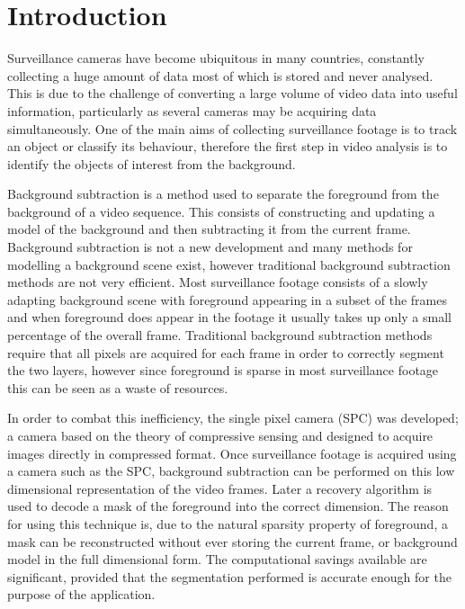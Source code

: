 \section{Introduction}
Surveillance cameras have become ubiquitous in many countries, constantly collecting a huge amount of data most of which is stored and never analysed. This is due to the challenge of converting a large volume of video data into useful information, particularly as several cameras may be acquiring data simultaneously. One of the main aims of collecting surveillance footage is to track an object or classify its behaviour, therefore the first step in video analysis is to identify the objects of interest from the background.


Background subtraction \cite{Piccardi2004a} is a method used to separate the foreground from the background of a video sequence. This consists of constructing and updating a model of the background and then subtracting it from the current frame. Background subtraction is not a new development and many methods for modelling a background scene exist, however traditional background subtraction methods are not very efficient. Most surveillance footage consists of a slowly adapting background scene with foreground appearing in a subset of the frames and when foreground does appear in the footage it usually takes up only a small percentage of the overall frame. Traditional background subtraction methods require that all pixels are acquired for each frame in order to correctly segment the two layers, however since foreground is sparse in most surveillance footage this can be seen as a waste of resources. 

In order to combat this inefficiency, the single pixel camera (SPC) \cite{Duarte2008a} was developed; a camera based on the theory of compressive sensing \cite{Candes2006, Candes2006a, Donoho2006} and designed to acquire images directly in compressed format. Once surveillance footage is acquired using a camera such as the SPC, background subtraction can be performed on this low dimensional representation of the video frames. Later a recovery algorithm is used to decode a mask of the foreground into the correct dimension. The reason for using this technique is, due to the natural sparsity property of foreground, a mask can be reconstructed without ever storing the current frame, or background model in the full dimensional form. The computational savings available are significant, provided that the segmentation performed is accurate enough for the purpose of the application. 

